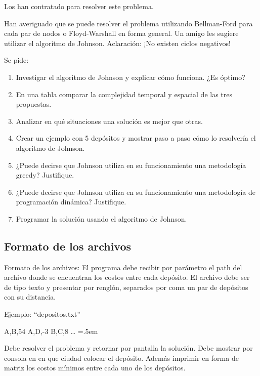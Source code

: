 \documentclass[titlepage,a4paper]{article}
\newenvironment{lcverbatim}
 {\SaveVerbatim{cverb}}
 {\endSaveVerbatim
  \flushleft\fboxrule=0pt\fboxsep=.5em
  \colorbox{cverbbg}{%
    \makebox[\dimexpr\linewidth-2\fboxsep][l]{\BUseVerbatim{cverb}}%
  }
  \endflushleft
}
\begin{document}
Los han contratado para resolver este problema.

Han averiguado que se puede resolver el problema utilizando Bellman-Ford para cada
par de nodos o Floyd-Warshall en forma general. Un amigo les sugiere utilizar el
algoritmo de Johnson. Aclaración: ¡No existen ciclos negativos!

\noindent Se pide:

\begin{enumerate}
    \item Investigar el algoritmo de Johnson y explicar cómo funciona. ¿Es óptimo?
    \item En una tabla comparar la complejidad temporal y espacial de las tres propuestas.
    \item Analizar en qué situaciones una solución es mejor que otras.
    \item Crear un ejemplo con 5 depósitos y mostrar paso a paso cómo lo resolvería el algoritmo de Johnson.
    \item ¿Puede decirse que Johnson utiliza en su funcionamiento una metodología greedy? Justifique.
    \item ¿Puede decirse que Johnson utiliza en su funcionamiento una metodología de programación dinámica? Justifique.
    \item Programar la solución usando el algoritmo de Johnson.
\end{enumerate}

\subsection{Formato de los archivos}
Formato de los archivos:
El programa debe recibir por parámetro el path del archivo donde se encuentran los
costos entre cada depósito. El archivo debe ser de tipo texto y presentar por renglón,
separados por coma un par de depósitos con su distancia.

Ejemplo: “depositos.txt”

\begin{lcverbatim}
    A,B,54
    A,D,-3
    B,C,8
    …
\end{lcverbatim}

Debe resolver el problema y retornar por pantalla la solución. Debe mostrar por
consola en en que ciudad colocar el depósito. Además imprimir en forma de matriz los
costos mínimos entre cada uno de los depósitos.

\setcounter{subsection}{0}%
\renewcommand{\thesubsection}{\arabic{subsection}}%
\end{document}
